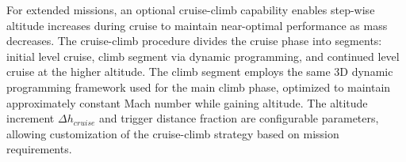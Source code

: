 For extended missions, an optional cruise-climb capability enables step-wise altitude increases during cruise to maintain near-optimal performance as mass decreases. The cruise-climb procedure divides the cruise phase into segments: initial level cruise, climb segment via dynamic programming, and continued level cruise at the higher altitude. The climb segment employs the same 3D dynamic programming framework used for the main climb phase, optimized to maintain approximately constant Mach number while gaining altitude. The altitude increment $\Delta h_{cruise}$ and trigger distance fraction are configurable parameters, allowing customization of the cruise-climb strategy based on mission requirements.
